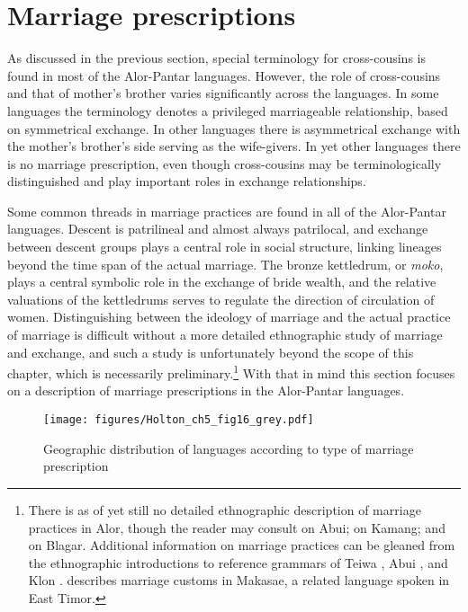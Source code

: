 \section{Marriage prescriptions}\label{sec:5:4}
As discussed in the previous section, special terminology for cross-cousins is found in most of the Alor-Pantar languages. However, the role of cross-cousins and that of mother's brother varies significantly across the languages. In some languages the terminology denotes a privileged marriageable relationship, based on symmetrical exchange. In other languages there is asymmetrical exchange with the mother's brother's side serving as the wife-givers. In yet other languages there is no marriage prescription, even though cross-cousins may be terminologically distinguished and  play important roles in exchange relationships. 

Some common threads in marriage practices are found in all of the Alor-Pantar languages. Descent is patrilineal and almost always patrilocal, and exchange between descent groups plays a central role in social structure, linking lineages beyond the time span of the actual marriage. The bronze kettledrum, or \textit{moko}, plays a central symbolic role in the exchange of bride wealth, and the relative valuations of the kettledrums serves to regulate the direction of circulation of women. Distinguishing between the ideology of marriage and the actual practice of marriage is difficult without a more detailed ethnographic study of marriage and exchange, and such a study is unfortunately beyond the scope of this chapter, which is necessarily preliminary.\footnote{There is as of yet still no detailed ethnographic description of marriage practices in Alor, though the reader may consult \citet{Nicolspeyer1940} on Abui; \citet{Stokhof1977} on Kamang; and \citet{Steinhauer2010} on Blagar. Additional information on marriage practices can be gleaned from the ethnographic introductions to reference grammars of Teiwa \citep{Klamer2010grammar}, Abui \citep{Kratochvil2007}, and Klon \citep{Baird2008}. \citet{Forman1980} describes marriage customs in Makasae, a related language spoken in East Timor.} With that in mind this section focuses on a description of marriage prescriptions in the Alor-Pantar languages. 

\begin{figure}[t]
\centering
\texttt{[image: figures/Holton\_ch5\_fig16\_grey.pdf]}
\caption{Geographic distribution of languages according to type of marriage prescription}
\label{fig:5:16}
\end{figure}

